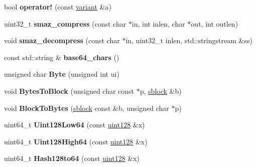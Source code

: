 \begin{DoxyCompactItemize}
\item 
\mbox{\label{namespacefc_a55ae7a9524bda543c6d7aed0bf7794ee}} 
bool {\bfseries operator!} (const \mbox{\hyperlink{classfc_1_1variant}{variant}} \&a)
\item 
\mbox{\label{namespacefc_ad0d1e863d8c267f0b9d9781fbbc652b9}} 
uint32\+\_\+t {\bfseries smaz\+\_\+compress} (const char $\ast$in, int inlen, char $\ast$out, int outlen)
\item 
\mbox{\label{namespacefc_a320d3d44d794b4247c4089d86280dd45}} 
void {\bfseries smaz\+\_\+decompress} (const char $\ast$in, uint32\+\_\+t inlen, std\+::stringstream \&ss)
\item 
\mbox{\label{namespacefc_a5f5b76828ed8ccfcf4d99d5c36743dd3}} 
const std\+::string \& {\bfseries base64\+\_\+chars} ()
\item 
\mbox{\label{namespacefc_a183d101f569ca9f1a3ab1591f95f770b}} 
unsigned char {\bfseries Byte} (unsigned int ui)
\item 
\mbox{\label{namespacefc_a64f5f8b870a5ddc652f874ad6e1b1a3b}} 
void {\bfseries Bytes\+To\+Block} (unsigned char const $\ast$p, \mbox{\hyperlink{structfc_1_1sblock}{sblock}} \&b)
\item 
\mbox{\label{namespacefc_a080d6e51af1617431899e75b314a65c5}} 
void {\bfseries Block\+To\+Bytes} (\mbox{\hyperlink{structfc_1_1sblock}{sblock}} const \&b, unsigned char $\ast$p)
\item 
\mbox{\label{namespacefc_a84a44059b35881e55bc326c1e0aaf2d7}} 
uint64\+\_\+t {\bfseries Uint128\+Low64} (const \mbox{\hyperlink{classfc_1_1uint128}{uint128}} \&x)
\item 
\mbox{\label{namespacefc_a74555130e68faf5849d916babc2a7c00}} 
uint64\+\_\+t {\bfseries Uint128\+High64} (const \mbox{\hyperlink{classfc_1_1uint128}{uint128}} \&x)
\item 
\mbox{\label{namespacefc_af582dd90106af58e139cff580b1fccd4}} 
uint64\+\_\+t {\bfseries Hash128to64} (const \mbox{\hyperlink{classfc_1_1uint128}{uint128}} \&x)

\end{DoxyCompactItemize}
